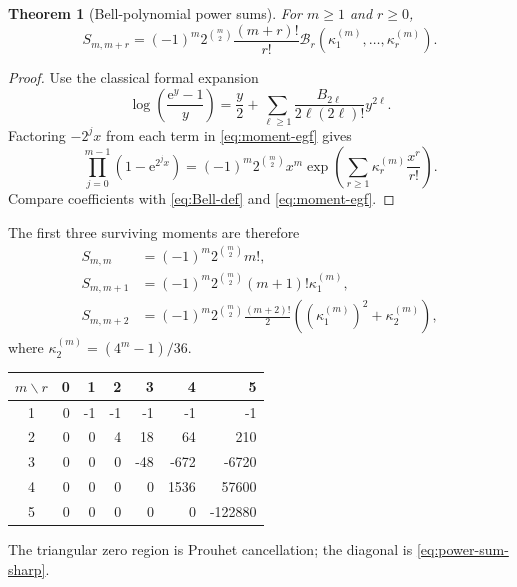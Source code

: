 \documentclass[11pt,oneside]{article}
\newtheorem{theorem}{Theorem}[section]
\theoremstyle{definition}
\theoremstyle{remark}
\newcommand{\e}{\mathrm e}
\newcommand{\Bell}{\mathcal B}
\begin{document}
\begin{theorem}[Bell-polynomial power sums]
\label{thm:power-sum-bell}
For \(m\ge1\) and \(r\ge0\),
\begin{equation}
 \boxed{\quad
 S_{m,m+r}
 =(-1)^m2^{\binom m2}\frac{(m+r)!}{r!}
 \Bell_r\!\left(\kappa_1^{(m)},\ldots,\kappa_r^{(m)}\right).
 \quad}
 \label{eq:power-sum-bell}
\end{equation}
\end{theorem}

\begin{proof}
Use the classical formal expansion
\begin{equation}
 \log\!\left(\frac{\e^y-1}{y}\right)
 =\frac y2+\sum_{\ell\ge1}
   \frac{B_{2\ell}}{2\ell(2\ell)!}y^{2\ell}.
 \label{eq:log-expm1}
\end{equation}
Factoring \(-2^jx\) from each term in \eqref{eq:moment-egf} gives
\begin{equation}
 \prod_{j=0}^{m-1}(1-\e^{2^jx})
 =(-1)^m2^{\binom m2}x^m
   \exp\!\left(\sum_{r\ge1}\kappa_r^{(m)}\frac{x^r}{r!}\right).
 \label{eq:moment-bell-factor}
\end{equation}
Compare coefficients with \eqref{eq:Bell-def} and
\eqref{eq:moment-egf}.
\end{proof}

The first three surviving moments are therefore
\begin{align}
 S_{m,m}
 &=(-1)^m2^{\binom m2}m!,
 \label{eq:first-surviving}\\
 S_{m,m+1}
 &=(-1)^m2^{\binom m2}(m+1)!\kappa_1^{(m)},
 \label{eq:second-surviving}\\
 S_{m,m+2}
 &=(-1)^m2^{\binom m2}\frac{(m+2)!}{2}
   \left((\kappa_1^{(m)})^2+\kappa_2^{(m)}\right),
 \label{eq:third-surviving}
\end{align}
where \(\kappa_2^{(m)}=(4^m-1)/36\).

\begin{center}
\begin{tabular}{@{}c|rrrrrr@{}}
\toprule
\(m\backslash r\) & 0 & 1 & 2 & 3 & 4 & 5\\
\midrule
1 & 0 & -1 & -1 & -1 & -1 & -1\\
2 & 0 & 0 & 4 & 18 & 64 & 210\\
3 & 0 & 0 & 0 & -48 & -672 & -6720\\
4 & 0 & 0 & 0 & 0 & 1536 & 57600\\
5 & 0 & 0 & 0 & 0 & 0 & -122880\\
\bottomrule
\end{tabular}
\end{center}
The triangular zero region is Prouhet cancellation; the diagonal is
\eqref{eq:power-sum-sharp}.
\end{document}
